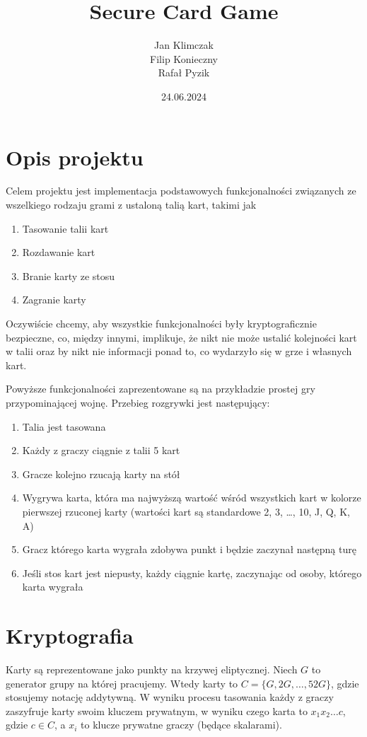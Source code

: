 \documentclass{article}
\title{Secure Card Game}
\author{Jan Klimczak \\ Filip Konieczny \\ Rafał Pyzik}
\date{24.06.2024}
\begin{document}
\maketitle

\section{Opis projektu}

Celem projektu jest implementacja podstawowych funkcjonalności związanych ze wszelkiego rodzaju grami z ustaloną talią kart, takimi jak
\begin{enumerate}
    \item Tasowanie talii kart
    \item Rozdawanie kart
    \item Branie karty ze stosu
    \item Zagranie karty
\end{enumerate}

Oczywiście chcemy, aby wszystkie funkcjonalności były kryptograficznie bezpieczne, co, między innymi,  implikuje, że nikt nie może ustalić kolejności kart w talii oraz by nikt nie informacji ponad to, co wydarzyło się w grze i własnych kart.  

Powyższe funkcjonalności zaprezentowane są na przykładzie prostej gry przypominającej wojnę. Przebieg rozgrywki jest następujący:

\begin{enumerate}
    \item Talia jest tasowana
    \item Każdy z graczy ciągnie z talii 5 kart
    \item Gracze kolejno rzucają karty na stół
    \item Wygrywa karta, która ma najwyższą wartość wśród wszystkich kart w kolorze pierwszej rzuconej karty (wartości kart są standardowe 2, 3, \ldots, 10, J, Q, K, A)
    \item Gracz którego karta wygrała zdobywa punkt i będzie zaczynał następną turę
    \item Jeśli stos kart jest niepusty, każdy ciągnie kartę, zaczynając od osoby, którego karta wygrała
\end{enumerate}


\section{Kryptografia}

Karty są reprezentowane jako punkty na krzywej eliptycznej. Niech $G$ to generator grupy na której pracujemy. Wtedy karty to $C = \{G,2G,\ldots,52G\}$, gdzie stosujemy notację addytywną. W wyniku procesu tasowania każdy z graczy zaszyfruje karty swoim kluczem prywatnym, w wyniku czego karta to $x_1x_2\ldots c$, gdzie $c \in C$, a $x_i$ to klucze prywatne graczy (będące skalarami).
\end{document}
